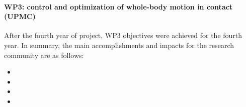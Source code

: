 

 
\paragraph*{WP3: control and optimization of whole-body motion in contact (UPMC)}

After the fourth year of project, WP3 objectives were achieved for the fourth year. In summary, the main accomplishments and impacts for the research community are as follows: 


\begin{itemize}

\item 
\item 
\item 
\item 

 \end{itemize}


